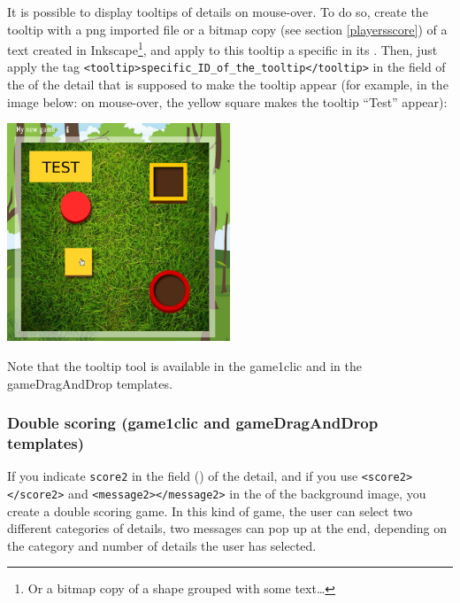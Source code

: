 It is possible to display tooltips of details on mouse-over. To do so, 
create the tooltip with a png imported file or a bitmap copy (see section \ref{playersscore})
of a text created in 
Inkscape\footnote{Or a bitmap copy of a shape grouped with some text\ldots}, and 
apply to this tooltip a specific  in its . Then, 
just apply the tag \verb|<tooltip>specific_ID_of_the_tooltip</tooltip>| in the 
 field of the  of the detail that is supposed 
to make the tooltip appear (for example, in the image below: on mouse-over, the
yellow square makes the tooltip ``Test'' appear):\\


\begin{center}
 \includegraphics[width=0.5\textwidth]{images/tooltip_example}\\
 \end{center}

Note that the tooltip tool is available in the game1clic and in the gameDragAndDrop templates.\\
 

\subsubsection{Double scoring (game1clic and gameDragAndDrop templates)}

If you indicate \verb|score2| in the  field
() of the detail,
and if you use \texttt{<score2></score2>} and  \texttt{<message2></message2>} 
in the  of the 
background image, you create a double scoring game. In this kind of game, the
user can select two different categories of details, 
two messages can pop up at the end, depending on the category and number
of details the user has selected.

